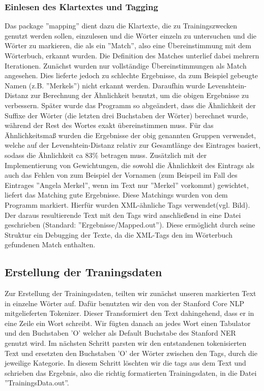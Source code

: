 \documentclass[a4paper]{article}
\begin{document}
\subsubsection{Einlesen des Klartextes und Tagging}
Das package ''mapping'' dient dazu die Klartexte, die zu Trainingszwecken genutzt werden sollen, einzulesen und die Wörter einzeln zu untersuchen und die Wörter zu markieren, die als ein ''Match'', also eine Übereinstimmung mit dem Wörterbuch, erkannt wurden.
Die Definition des Matches unterlief dabei mehrern Iterationen. Zunächst wurden nur vollständige Übereinstimmungen als Match angesehen.
Dies lieferte jedoch zu schlechte Ergebnisse, da zum Beispiel gebeugte Namen (z.B. ''Merkels'') nicht erkannt werden.
Daraufhin wurde Levenshtein-Distanz zur Berechnung der Ähnlichkeit benutzt, um die obigen Ergebnisse zu verbessern. Später wurde das Programm so abgeändert, dass die Ähnlichkeit der Suffixe der Wörter (die letzten drei Buchstaben der Wörter) berechnet wurde, während der Rest des Wortes exakt übereinstimmen muss. Für das Ähnlichkeitsmaß wurden die Ergebnisse der obig genannten Gruppen verwendet, welche auf der Levenshtein-Distanz relativ zur Gesamtlänge des Eintrages basiert, sodass die Ähnlichkeit ca 83\% betragen muss.
Zusätzlich mit der Implementierung von Gewichtungen, die sowohl die Ähnlichkeit des Eintrags als auch das Fehlen von zum Beispiel der Vornamen (zum Beispeil im Fall des Eintrages ''Angela Merkel'', wenn im Text nur ''Merkel'' vorkommt) gewichtet, liefert das Matching gute Ergebnisse. Diese Matchings wurden von dem Programm markiert. Hierfür wurden XML-ähnliche Tags verwendet(vgl. Bild).
Der daraus resultierende Text mit den Tags wird anschließend in eine Datei geschrieben (Standard: ''Ergebnisse/Mapped.out''). Diese ermöglicht durch seine Struktur ein Debugging der Texte, da die XML-Tags den im Wörterbuch gefundenen Match enthalten.

\subsection{Erstellung der Traningsdaten}
Zur Erstellung der Trainingsdaten, teilten wir zunächst unseren markierten Text in einzelne Wörter auf. Dafür benutzten wir den von der Stanford Core NLP mitgelieferten Tokenizer. Dieser Transformiert den Text dahingehend, dass er in eine Zeile ein Wort schreibt. Wir fügten danach an jedes Wort einen Tabulator und den Buchstaben 'O' welcher als Default Buchstabe des Stanford NER genutzt wird.
Im nächsten Schritt parsten wir den entstandenen tokenisierten Text und ersetzten den Buchstaben 'O' der Wörter zwischen den Tags, durch die jeweilige Kategorie. In diesem Schritt löschten wir die tags aus dem Text und schrieben das Ergebnis, also die richtig formatierten Trainingsdaten, in die Datei ''TrainingsData.out''.
\end{document}
